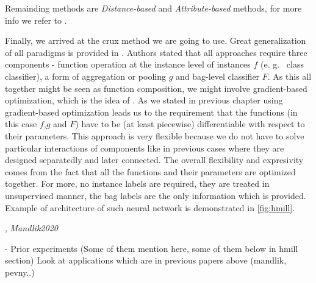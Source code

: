 Remainding methods are \emph{Distance-based} and \emph{Attribute-based} methods, for more info we refer to \cite{Amores2013}.

Finally, we arrived at the crux method we are going to use. Great generalization of all paradigms is provided in \cite{Mandlik2020}. Authors stated that all approaches require three components - function operation at the instance level of instances $f$ (e. g. \ class classifier), a form of aggregation or pooling $g$ and bag-level classifier $F$. As this all together might be seen as function composition, we might involve gradient-based optimization, which is the idea of \cite{Pevny2016a, Edwards2017}. As we stated in previous chapter using gradient-based optimization leads us to the requirement that the functions (in this case $f$,$g$ and $F$) have to be (at least piecewise) differentiable with respect to their parameters. This approach is very flexible because we do not have to solve particular interactions of components like in previous cases where they are designed separatedly and later connected. The overall flexibility and expresivity comes from the fact that all the functions and their parameters are optimized together. For more, no instance labels are required, they are treated in unsupervised manner, the bag labels are the only information which is provided. Example of architecture of such neural network is demonstrated in \ref{fig:hmill}.






, \emph{Mandlik2020}  \cite{Pevny2016a} \cite{Pevny2017} \cite{PevnyDedic2020}
 \cite{Zaheer2018}

- Prior experiments (Some of them mention here, some of them below in hmill section)
    Look at applications which are in previous papers above (mandlik, pevny..)
        \cite{Stiborek2018}
        \cite{Janisch2020}
        \cite{PevnyDedic2020}
        \cite{PevnyKovarik2019a}
        \cite{Zaheer2018}

